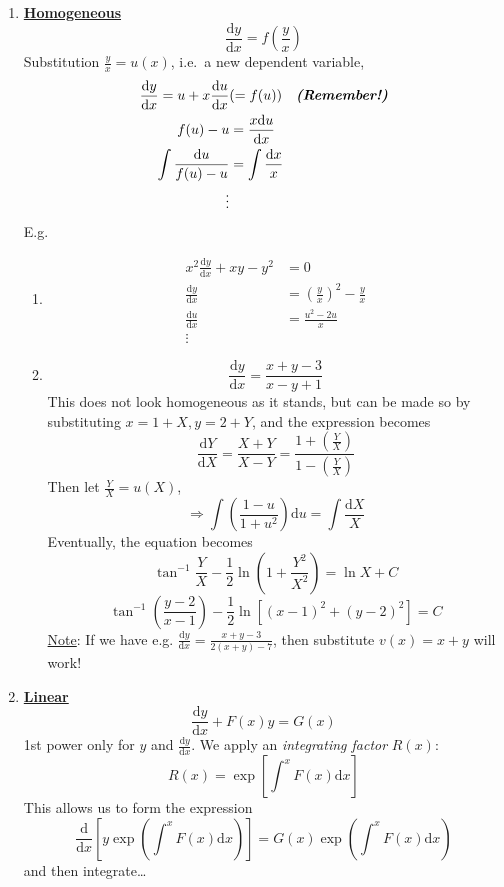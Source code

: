 \documentclass[12pt]{report}
\theoremstyle{definition}
\begin{document}
\begin{enumerate}[label = (\alph*)]
\item \textbf{\underline{Homogeneous}} \[
        \frac{\mathrm{d}y}{\mathrm{d}x} = f\left(\frac{y}{x}\right) 
    \]Substitution $\frac{y}{x} = u(x)$,
    i.e.\ a new dependent variable, \[
        \begin{align*}
            \frac{\mathrm{d}y}{\mathrm{d}x} = u + x\frac{\mathrm{d}u}{\mathrm{d}x} & (= f(u)) 
            \quad \textnormal{\textbf{\emph{(Remember!)}}} \\
            f(u) - u & = \frac{x\mathrm{d}u}{\mathrm{d}x} \\
            \int \frac{\mathrm{d}u}{f(u) - u} & = \int \frac{\mathrm{d}x}{x} \\
            \vdots
        \end{align*}
    \]
    E.g. 
    \begin{enumerate}[label = (\roman*)]
        \item \[
            \begin{align*}
                x^{2} \frac{\mathrm{d}y}{\mathrm{d}x} + xy - y^{2} & = 0 \\
                \frac{\mathrm{d}y}{\mathrm{d}x} & = {\left(\frac{y}{x}\right)}^{2} - \frac{y}{x} \\
                \frac{\mathrm{d}u}{\mathrm{d}x} & = \frac{u^{2} - 2u}{x} \\
                \vdots
            \end{align*}
        \]
    \item \[
        \frac{\mathrm{d}y}{\mathrm{d}x} = \frac{x + y - 3}{x - y + 1}
    \]This does not look homogeneous as it stands, but can be made so by substituting
    $x= 1 + X, y = 2 + Y$, and the expression becomes\[
        \frac{\mathrm{d}Y}{\mathrm{d}X} = \frac{X + Y}{X - Y} 
        = \frac{1 + \left(\frac{Y}{X}\right)}{1 - \left(\frac{Y}{X}\right)}
    \]Then let $\frac{Y}{X} = u(X)$,\[
    \Rightarrow \int \left(\frac{1-u}{1+u^2}\right) \mathrm{d}u = \int \frac{\mathrm{d}X}{X}
    \]
    Eventually, the equation becomes\[
        \tan^{-1}{\frac{Y}{X}} - \frac{1}{2} \ln{\left(1 + \frac{Y^2}{X^2}\right)} 
        = \ln{X} + C
    \]\[
    \tan^{-1}{\left(\frac{y-2}{x-1}\right)} - \frac{1}{2} \ln{\left[{(x-1)}^{2} + {(y-2)}^{2}\right] } = C
    \]
    \underline{Note}: If we have e.g. $\frac{\mathrm{d}y}{\mathrm{d}x} = \frac{x + y - 3}{2(x + y) - 7}$,
    then substitute $v(x) = x + y$ will work!
    \end{enumerate}

\item \textbf{\underline{Linear}} \[
        \frac{\mathrm{d}y}{\mathrm{d}x} + F(x)y = G(x)
        \]
        1st power only for $y$ and $\frac{\mathrm{d}y}{\mathrm{d}x} $.
        We apply an \emph{integrating factor} $R(x)$: \[
R(x) = \exp{\left[\int_{}^{x} F(x)\mathrm{d}x\right] }
\] This allows us to form the expression\[
\frac{\mathrm{d}}{\mathrm{d}x} \left[y \exp{\left(\int_{}^{x} F(x)\mathrm{d}x\right) }\right] 
= G(x) \exp{\left(\int_{}^{x} F(x)\mathrm{d}x\right) }
\]and then integrate\ldots


\end{enumerate}
\end{document}
